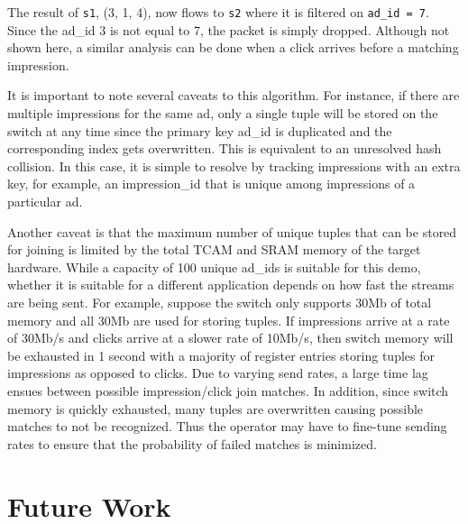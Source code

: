 \documentclass[12pt, oneside]{article}
\begin{document}
The result of \texttt{s1}, (3, 1, 4), now flows to \texttt{s2} where it is filtered on \texttt{ad\_id = 7}. Since the ad\_id 3 is not equal to 7, the packet is simply dropped. Although not shown here, a similar analysis can be done when a click arrives before a matching impression.  

It is important to note several caveats to this algorithm. For instance, if there are multiple impressions for the same ad, only a single tuple will be stored on the switch at any time since the primary key ad\_id is duplicated and the corresponding index gets overwritten. This is equivalent to an unresolved hash collision. In this case, it is simple to resolve by tracking impressions with an extra key, for example, an impression\_id that is unique among impressions of a particular ad. 

Another caveat is that the maximum number of unique tuples that can be stored for joining is limited by the total TCAM and SRAM memory of the target hardware. While a capacity of 100 unique ad\_ids is suitable for this demo, whether it is suitable for a different application depends on how fast the streams are being sent. For example, suppose the switch only supports 30Mb of total memory and all 30Mb are used for storing tuples. If impressions arrive at a rate of 30Mb/s and clicks arrive at a slower rate of 10Mb/s, then switch memory will be exhausted in 1 second with a majority of register entries storing tuples for impressions as opposed to clicks. Due to varying send rates, a large time lag ensues between possible impression/click join matches. In addition, since switch memory is quickly exhausted, many tuples are overwritten causing possible matches to not be recognized. Thus the operator may have to fine-tune sending rates to ensure that the probability of failed matches is minimized.    

\newpage
\section{Future Work}
\end{document}
